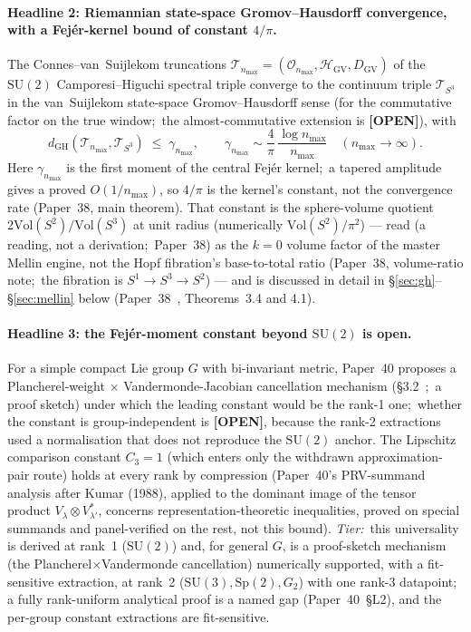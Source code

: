\documentclass[11pt,a4paper]{article}
\theoremstyle{plain}
\theoremstyle{definition}
\newcommand{\nmax}{n_{\max}}
\newcommand{\sthree}{S^{3}}
\newcommand{\HGV}{\mathcal{H}_{\mathrm{GV}}}
\newcommand{\DGV}{D_{\mathrm{GV}}}
\newcommand{\Op}{\mathcal{O}}
\newcommand{\Tcal}{\mathcal{T}}
\newcommand{\SU}{\mathrm{SU}}
\newcommand{\Vol}{\mathrm{Vol}}
\newcommand{\gvc}[2]{#2}
\begin{document}
\paragraph{Headline 2: Riemannian state-space Gromov--Hausdorff
convergence, with a Fej\'er-kernel bound of constant $4/\pi$.}
\gvc{wh1-p38-gh-convergence}{The Connes--van~Suijlekom truncations
$\Tcal_{\nmax} = (\Op_{\nmax}, \HGV, \DGV)$ of the
$\SU(2)$ Camporesi--Higuchi spectral triple converge to the continuum
triple $\Tcal_{\sthree}$ in the van~Suijlekom state-space
Gromov--Hausdorff sense (for the commutative factor on the true window;\
the almost-commutative extension is \textbf{[OPEN]})}, with
\begin{equation}
d_{\mathrm{GH}}(\Tcal_{\nmax}, \Tcal_{\sthree})
\;\le\; \gamma_{\nmax},
\qquad
\gamma_{\nmax} \sim \frac{4}{\pi}\,\frac{\log \nmax}{\nmax}
\quad (\nmax \to \infty).
\label{eq:headline_2}
\end{equation}
Here $\gamma_{\nmax}$ is the first moment of the central Fej\'er kernel;\ a
tapered amplitude gives a proved $O(1/\nmax)$, so $4/\pi$ is the kernel's
constant, not the convergence rate (Paper~38, main theorem).  That constant is
the sphere-volume quotient
$2\Vol(S^{2})/\Vol(\sthree)$ at unit radius (numerically $\Vol(S^{2})/\pi^{2}$)
--- read (a reading, not a derivation;\ Paper~38) as the $k = 0$ volume
factor of the master Mellin engine, not the Hopf
fibration's base-to-total ratio (Paper~38, volume-ratio note;\ the fibration is
$S^{1} \to \sthree \to S^{2}$) --- and is
discussed in detail in \S\ref{sec:gh}--\S\ref{sec:mellin} below
(Paper~38~\cite{paper38}, Theorems~3.4 and 4.1).

\paragraph{Headline 3: the Fej\'er-moment constant beyond $\SU(2)$ is open.}
For a simple compact Lie group $G$ with bi-invariant metric, Paper~40
proposes a Plancherel-weight $\times$ Vandermonde-Jacobian cancellation
mechanism (\S 3.2~\cite{paper40_unified};\ a proof sketch) under which
the leading constant would be the rank-1 one;\ whether the constant is
group-independent is \textbf{[OPEN]}, because the rank-2 extractions used
a normalisation that does not reproduce the $\SU(2)$ anchor.
\gvc{lipschitz-c3-compression}{The Lipschitz comparison constant
$C_{3} = 1$ (which enters only the withdrawn approximation-pair route)
holds at every rank by compression} (Paper~40's PRV-summand analysis
after Kumar (1988), applied to the dominant image of the tensor product
$V_{\lambda} \otimes V_{\lambda'}^{*}$, concerns representation-theoretic
inequalities, proved on special summands and panel-verified on the rest,
not this bound).  \emph{Tier:}\ this universality
is derived at rank~1 ($\SU(2)$) and, for general $G$, is a
proof-sketch mechanism (the Plancherel$\times$Vandermonde cancellation)
numerically supported, with a fit-sensitive extraction, at rank~2
($\SU(3),\mathrm{Sp}(2),G_{2}$) with one rank-3 datapoint; a fully rank-uniform analytical proof is a named gap
(Paper~40~\S L2), and the per-group constant extractions are
fit-sensitive.
\end{document}
